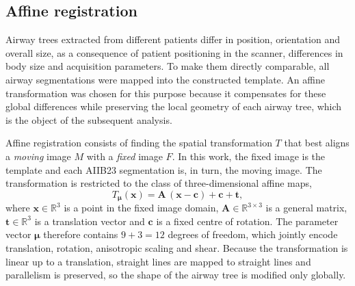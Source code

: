 
\subsection{Affine registration}
\label{sec:affine}               %



\newcommand{\ncases}{\TODO{N}}                %
\newcommand{\antspyversion}{\TODO{x.y.z}}     %

Airway trees extracted from different patients differ in position, orientation
and overall size, as a consequence of patient positioning in the scanner,
differences in body size and acquisition parameters. To make them directly
comparable, all airway segmentations were mapped into the constructed template.
 An affine transformation was chosen for this purpose because it compensates for these global differences
while preserving the local geometry of each airway tree, which is the object of
the subsequent analysis.

Affine registration consists of finding the spatial transformation $T$ that best aligns
a \emph{moving} image $M$ with a \emph{fixed} image $F$. In this work, the fixed
image is the template and each AIIB23 segmentation is, in turn, the moving
image. The transformation is restricted to the class of three-dimensional affine
maps,
\begin{equation}
  T_{\boldsymbol{\mu}}(\mathbf{x}) = \mathbf{A}\,(\mathbf{x} - \mathbf{c}) + \mathbf{c} + \mathbf{t},
  \label{eq:affine}              %
\end{equation}
where $\mathbf{x} \in \mathbb{R}^3$ is a point in the fixed image domain,
$\mathbf{A} \in \mathbb{R}^{3\times 3}$ is a general matrix,
$\mathbf{t} \in \mathbb{R}^3$ is a translation vector and $\mathbf{c}$ is a
fixed centre of rotation. The parameter vector $\boldsymbol{\mu}$ therefore
contains $9 + 3 = 12$ degrees of freedom, which jointly encode translation,
rotation, anisotropic scaling and shear. Because the transformation is linear up
to a translation, straight lines are mapped to straight lines and parallelism is
preserved, so the shape of the airway tree is modified only globally.

